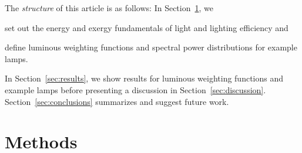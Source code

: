 \documentclass[energies,article,accept,moreauthors,pdftex]{Definitions/mdpi}\usepackage[]{graphicx}\usepackage[]{color}
\providecommand{\DIFaddend}{} %
\providecommand{\DIFdelbegin}{} %
\newcommand{\DIFscaledelfig}{0.5}
\newlength{\DIFdelgraphicswidth} %
\newlength{\DIFdelgraphicsheight} %
\newcommand{\DIFdelincludegraphics}[2][]{%
\sbox{\DIFdelgraphicsbox}{\DIFOincludegraphics[#1]{#2}}%
\settoboxwidth{\DIFdelgraphicswidth}{\DIFdelgraphicsbox} %
\settoboxtotalheight{\DIFdelgraphicsheight}{\DIFdelgraphicsbox} %
\scalebox{\DIFscaledelfig}{%
\parbox[b]{\DIFdelgraphicswidth}{\usebox{\DIFdelgraphicsbox}\\[-\baselineskip] \rule{\DIFdelgraphicswidth}{0em}}\llap{\resizebox{\DIFdelgraphicswidth}{\DIFdelgraphicsheight}{%
\setlength{\unitlength}{\DIFdelgraphicswidth}%
\begin{picture}(1,1)%
\thicklines\linethickness{2pt} %
{\color[rgb]{1,0,0}\put(0,0){\framebox(1,1){}}}%
{\color[rgb]{1,0,0}\put(0,0){\line( 1,1){1}}}%
{\color[rgb]{1,0,0}\put(0,1){\line(1,-1){1}}}%
\end{picture}%
}\hspace*{3pt}}} %
} %
\DeclareRobustCommand{\DIFaddend}{\DIFOaddend \let\includegraphics\DIFOincludegraphics} %
\DeclareRobustCommand{\DIFdelbegin}{\DIFOdelbegin \let\includegraphics\DIFdelincludegraphics} %
\begin{document}
The \emph{structure} of this article is as follows:
In Section~\ref{sec:methods}, we 
%
\begin{enumerate*}[label={(\alph*)}]

  \item set out the energy and exergy fundamentals of light and lighting efficiency and

  \item define luminous weighting functions and spectral power distributions for example lamps.

\end{enumerate*}
%
In Section~\ref{sec:results}, we show results for luminous weighting functions and example lamps before
presenting a discussion in Section~\ref{sec:discussion}.
Section~\ref{sec:conclusions} summarizes and {suggest future work}\DIFaddend .


\section{Methods}
\label{sec:methods}

\DIFdelbegin %
\vspace{-6pt}
\end{document}
